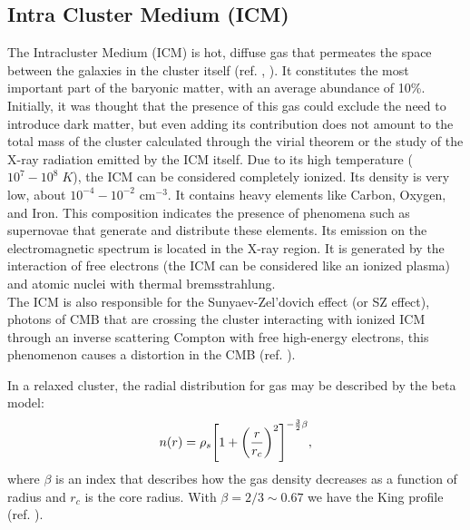 \subsection{Intra Cluster Medium (ICM)}
The Intracluster Medium (ICM) is hot, diffuse gas that permeates the space between the galaxies in the cluster itself (ref. \cite{CavaliereGurskyTucker1971}, \cite{Forman_Kellogg_Gursky_1972}). It constitutes the most important part of the baryonic matter, with an average abundance of 10\%.
Initially, it was thought that the presence of this gas could exclude the need to introduce dark matter, but even adding its contribution does not amount to the total mass of the cluster calculated through the virial theorem or the study of the X-ray radiation emitted by the ICM itself.
Due to its high temperature ($10^7 - 10^8 \; K$), the ICM can be considered completely ionized. Its density is very low, about $10^{-4} - 10^{-2} \text{ cm}^{-3}$. It contains heavy elements like Carbon, Oxygen, and Iron. This composition indicates the presence of phenomena such as supernovae that generate and distribute these elements.
Its emission on the electromagnetic spectrum is located in the X-ray region. It is generated by the interaction of free electrons (the ICM can be considered like an ionized plasma) and atomic nuclei with thermal bremsstrahlung.\\ 
The ICM is also responsible for the Sunyaev-Zel'dovich effect (or SZ effect), photons of CMB that are crossing the cluster interacting with ionized ICM through an inverse scattering Compton with free high-energy electrons, this phenomenon causes a distortion in the CMB (ref. \cite{SZ_effect}).

In a relaxed cluster, the radial distribution for gas may be described by the beta model:
\begin{equation} \label{gas fit}
    n(r) = \rho_s \qty[1+\qty(\frac{r}{r_c})^2]^{-\frac{3}{2} \beta},
\end{equation}
where $\beta$ is an index that describes how the gas density decreases as a function of radius and $r_c$ is the core radius. With $\beta = 2/3 \sim 0.67$ we have the King profile (ref. \cite{King_profile}).

